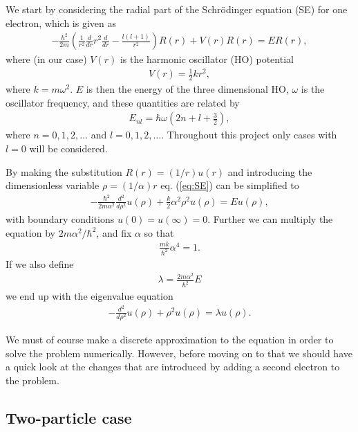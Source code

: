 \documentclass[12pt, a4paper]{article}
\begin{document}
We start by considering the radial part of the Schrödinger equation (SE) for one electron, which is 
given as 
\begin{align}
- \frac{\hbar^2}{2m}\left( \frac{1}{r^2} \frac{d}{dr}r^2 \frac{d}{dr} - \frac{l(l+1)}{r^2} \right) R(r) 
+ V(r) R(r) = ER(r),
\label{eq:SE}    
\end{align}    
where (in our case) $V(r)$ is the harmonic oscillator (HO) potential 
\begin{align*}
V(r) = \frac{1}{2} k r^2, 
\end{align*}
where $k = m\omega^2$. $E$ is then the energy of the three dimensional HO, $\omega$ is the 
oscillator frequency, and these quantities are related by 
\begin{align*}
E_{nl} = \hbar \omega \left( 2n + l + \frac{3}{2} \right), 
\end{align*}
where $n = 0,1,2,\dots$ and $l = 0,1,2,\dots$. Throughout this project only cases with $l = 0$ will be 
considered. 

By making the substitution $R(r) = (1/r)u(r)$ and introducing the dimensionless variable 
$\rho = (1/\alpha)r$ eq. (\ref{eq:SE}) can be simplified to 
\begin{align*}
-\frac{\hbar^2}{2m\alpha^2} \frac{d^2}{d\rho^2}u(\rho) + \frac{k}{2}\alpha^2 \rho^2 u(\rho) = Eu(\rho),  
\end{align*} 
with boundary conditions $u(0) = u(\infty) = 0$. 
Further we can multiply the equation by $2m\alpha^2/\hbar^2$, and fix $\alpha$ so that 
\begin{align*}
\frac{mk}{\hbar^2}\alpha^4 = 1.  
\end{align*}
If we also define 
\begin{align*}
\lambda = \frac{2m \alpha^2}{\hbar^2}E 
\end{align*}
we end up with the eigenvalue equation 
\begin{align}
- \frac{d^2}{d\rho^2}u(\rho) + \rho^2u(\rho) = \lambda u(\rho). 
\label{eq:SE_1p_scaled}
\end{align}

We must of course make a discrete approximation to the equation in order to solve the problem numerically. 
However, before moving on to that we should have a quick look at the changes that are introduced by 
adding a second electron to the problem. 

\subsection{Two-particle case}
\end{document}
